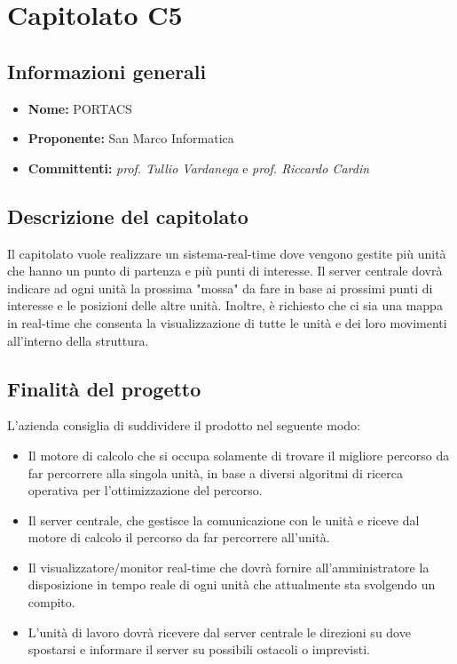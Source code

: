 \section{Capitolato C5}

\subsection{Informazioni generali}
\begin{itemize}
\item \textbf{Nome:} PORTACS
\item \textbf{Proponente:} San Marco Informatica
\item \textbf{Committenti:} \textit{prof. Tullio Vardanega} e \textit{prof. Riccardo Cardin}
\end{itemize}

\subsection{Descrizione del capitolato}
Il capitolato vuole realizzare un sistema-real-time dove vengono gestite più unità che hanno un punto di partenza e più punti di interesse.
Il server centrale dovrà indicare ad ogni unità la prossima "mossa" da fare in base ai prossimi punti di interesse e le posizioni delle altre unità. 
Inoltre, è richiesto che ci sia una mappa in real-time che consenta la visualizzazione di tutte le unità e dei loro movimenti all'interno della struttura.

\subsection{Finalità del progetto}
L'azienda consiglia di suddividere il prodotto nel seguente modo:
\begin{itemize}
\item Il motore di calcolo che si occupa solamente di trovare il migliore percorso da far percorrere alla singola unità, in base a diversi algoritmi di ricerca operativa per l'ottimizzazione del percorso.
\item Il server centrale, che gestisce la comunicazione con le unità e riceve dal motore di calcolo il percorso da far percorrere all'unità.
\item Il visualizzatore/monitor real-time che dovrà fornire all'amministratore la disposizione in tempo reale di ogni unità che attualmente sta svolgendo un compito.
\item L'unità di lavoro dovrà ricevere dal server centrale le direzioni su dove spostarsi e informare il server su possibili ostacoli o imprevisti.
\end{itemize}

